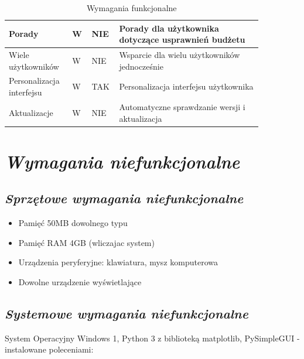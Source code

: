 \documentclass[a4paper,10pt, twoside]{report}
\newcommand{\customstylechapter}[1]{\large{\textit{#1}}}
\newcommand{\customstylesection}[1]{\textbf{\textit{#1}}}
\begin{document}
\begin{table}[h]
\begin{tabular}{|p{0.2\linewidth}|p{0.07\linewidth}|p{0.07\linewidth}|p{0.52\linewidth}|}
    \hline
    {Porady} & {W} & {NIE} & {Porady dla użytkownika dotyczące usprawnień budżetu}\\
    \hline
    {Wiele użytkowników} & {W} & {NIE} & {Wsparcie dla wielu użytkowników jednocześnie}\\
    \hline
    {Personalizacja interfejsu} & {W} & {TAK} & {Personalizacja interfejsu użytkownika}\\
    \hline
    {Aktualizacje} & {W} & {NIE} & {Automatyczne sprawdzanie wersji i aktualizacja}\\
    \hline
    \end{tabular}
    \caption{Wymagania funkcjonalne}
\end{table}

\chapter{\customstylechapter{Wymagania niefunkcjonalne}}
\section{\customstylesection{Sprzętowe wymagania niefunkcjonalne}}
\begin{itemize}
    \item Pamięć 50MB dowolnego typu
    \item Pamięć RAM 4GB (wliczajac system)
    \item Urządzenia peryferyjne: klawiatura, mysz komputerowa
    \item Dowolne urządzenie wyświetlające
\end{itemize}
\section{\customstylesection{Systemowe wymagania niefunkcjonalne}}
{System Operacyjny Windows 1, Python 3 z biblioteką matplotlib, PySimpleGUI - 
instalowane poleceniami:}
\end{document}
